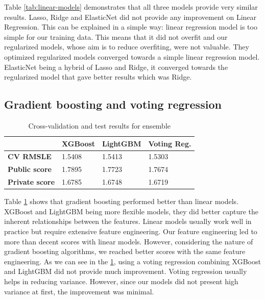 \documentclass[sigplan,screen]{acmart}
\begin{document}
Table \ref{tab:linear-models} demonstrates that all three models provide very similar results. Lasso, Ridge and ElasticNet did not provide any improvement on Linear Regression. This can be explained in a simple way: linear regression model is too simple for our training data. This means that it did not overfit and our regularized models, whose aim is to reduce overfiting, were not valuable. They optimized regularized models converged towards a simple linear regression model. ElasticNet being a hybrid of Lasso and Ridge, it converged towards the regularized model that gave better results which was Ridge.
\subsection{Gradient boosting and voting regression}
\vspace*{-\baselineskip}
\begin{table}[H]
\begin{tabular}{|l|l|l|l|}
\hline
                       & \textbf{XGBoost} & \textbf{LightGBM} & \textbf{Voting Reg.} \\ \hline
\textbf{CV RMSLE}      & 1.5408           & 1.5413            & 1.5303                    \\ \hline
\textbf{Public score}  & 1.7895           & 1.7723            & 1.7674                    \\ \hline
\textbf{Private score} & 1.6785           & 1.6748            & 1.6719                    \\ \hline
\end{tabular}
\caption{Cross-validation and test results for ensemble}
\label{tab:ensembling}
\end{table}
\vspace*{-\baselineskip}
Table \ref{tab:ensembling} shows that gradient boosting performed better than linear models. XGBoost and LightGBM being more flexible models, they did better capture the inherent relationships between the features. Linear models usually work well in practice but require extensive feature engineering. Our feature engineering led to more than decent scores with linear models. However, considering the nature of gradient boosting algorithms, we reached better scores with the same feature engineering. As we can see in the \ref{tab:ensembling}, using a voting regression combining XGBoost and LightGBM did not provide much improvement. Voting regression usually helps in reducing variance. However, since our models did not present high variance at first, the improvement was minimal.
\end{document}
